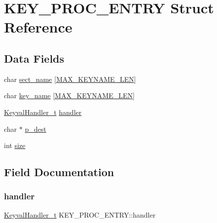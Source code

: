 \hypertarget{structKEY__PROC__ENTRY}{}\section{K\+E\+Y\+\_\+\+P\+R\+O\+C\+\_\+\+E\+N\+T\+RY Struct Reference}
\label{structKEY__PROC__ENTRY}
\subsection*{Data Fields}
\begin{DoxyCompactItemize}
\item 
char \mbox{\hyperlink{structKEY__PROC__ENTRY_a3804ddf6498f7f13de4167a1c6b0228a}{sect\+\_\+name}} \mbox{[}\mbox{\hyperlink{App__cfg_8h_addb07cdbee6530c76ccbb9a847885b33}{M\+A\+X\+\_\+\+K\+E\+Y\+N\+A\+M\+E\+\_\+\+L\+EN}}\mbox{]}
\item 
char \mbox{\hyperlink{structKEY__PROC__ENTRY_a522fce71c3da2e925a68c9b93fac3275}{key\+\_\+name}} \mbox{[}\mbox{\hyperlink{App__cfg_8h_addb07cdbee6530c76ccbb9a847885b33}{M\+A\+X\+\_\+\+K\+E\+Y\+N\+A\+M\+E\+\_\+\+L\+EN}}\mbox{]}
\item 
\mbox{\hyperlink{App__cfg_8h_a91ac6ca504feea17f06592604958620b}{Keyval\+Handler\+\_\+t}} \mbox{\hyperlink{structKEY__PROC__ENTRY_ad6b28e71cf197e550228c44a4997f373}{handler}}
\item 
char $\ast$ \mbox{\hyperlink{structKEY__PROC__ENTRY_a98ba413484ff80a2cc19ba72e92ecd3e}{p\+\_\+dest}}
\item 
int \mbox{\hyperlink{structKEY__PROC__ENTRY_a8ab57cd302d55f1d1cde0472cb1a1603}{size}}
\end{DoxyCompactItemize}


\subsection{Field Documentation}
\mbox{\label{structKEY__PROC__ENTRY_ad6b28e71cf197e550228c44a4997f373}} 
\subsubsection{\texorpdfstring{handler}{handler}}
{\footnotesize\ttfamily \mbox{\hyperlink{App__cfg_8h_a91ac6ca504feea17f06592604958620b}{Keyval\+Handler\+\_\+t}} K\+E\+Y\+\_\+\+P\+R\+O\+C\+\_\+\+E\+N\+T\+R\+Y\+::handler}

